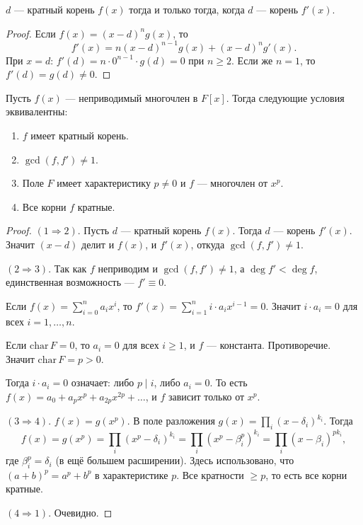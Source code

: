 \begin{stmt}
    $d$ --- кратный корень $f(x)$ тогда и только тогда, когда $d$ --- корень $f'(x)$.
    \begin{proof}
        Если $f(x) = (x - d)^n g(x)$, то
        \[
            f'(x) = n(x - d)^{n-1} g(x) + (x - d)^n g'(x).
        \]
        При $x = d$: $f'(d) = n \cdot 0^{n-1} \cdot g(d) = 0$ при $n \geq 2$. Если же $n = 1$, то $f'(d)
        = g(d) \neq 0$.
    \end{proof}
\end{stmt}


\begin{stmt}
    Пусть $f(x)$ --- неприводимый многочлен в $F[x]$. Тогда следующие условия эквивалентны:
    \begin{enumerate}
        \item $f$ имеет кратный корень.
        \item $\gcd(f, f') \neq 1$.
        \item Поле $F$ имеет характеристику $p \neq 0$ и $f$ --- многочлен от $x^p$.
        \item Все корни $f$ кратные.
    \end{enumerate}

    \begin{proof}
        $(1 \Rightarrow 2)$. Пусть $d$ --- кратный корень $f(x)$. Тогда $d$ --- корень $f'(x)$. Значит
        $(x - d)$ делит и $f(x)$, и $f'(x)$, откуда $\gcd(f, f') \neq 1$.

        $(2 \Rightarrow 3)$. Так как $f$ неприводим и $\gcd(f, f') \neq 1$, а $\deg f' < \deg f$, единственная возможность ---
        $f' \equiv 0$.

        Если $f(x) = \sum_{i=0}^n a_i x^i$, то $f'(x) = \sum_{i=1}^n i \cdot a_i x^{i-1} = 0$. Значит
        $i \cdot a_i = 0$ для всех $i = 1, \dots, n$.

        Если $\mathrm{char}\, F = 0$, то $a_i = 0$ для всех $i \geq 1$, и $f$ --- константа. Противоречие.
        Значит $\mathrm{char}\, F = p > 0$.

        Тогда $i \cdot a_i = 0$ означает: либо $p \mid i$, либо $a_i = 0$. То есть $f(x) = a_0 + a_p x^p + a_{2p}
        x^{2p} + \dots$, и $f$ зависит только от $x^p$.

        $(3 \Rightarrow 4)$. $f(x) = g(x^p)$. В поле разложения $g(x) = \prod_i (x - \delta_i)^{k_i}$.
        Тогда
        \[
            f(x) = g(x^p) = \prod_i (x^p - \delta_i)^{k_i} = \prod_i (x^p - \beta_i^p)^{k_i} = \prod_i (x - \beta_i)
            ^{pk_i},
        \]
        где $\beta_i^p = \delta_i$ (в ещё большем расширении). Здесь использовано, что $(a + b)^p = a^p + b^p
        $ в характеристике $p$. Все кратности $\geq p$, то есть все корни кратные.

        $(4 \Rightarrow 1)$. Очевидно.
    \end{proof}
\end{stmt}


